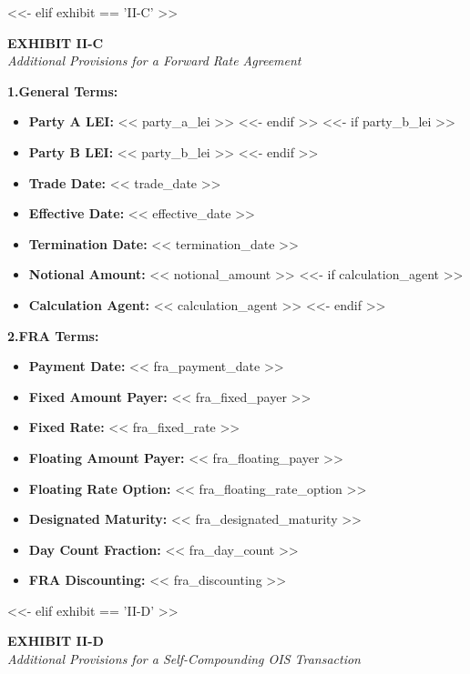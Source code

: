 \documentclass[11pt, a4paper]{article}
\begin{document}
<<- elif exhibit == 'II-C' >>
\begin{center}
    \textbf{EXHIBIT II-C} \\
    \textit{Additional Provisions for a Forward Rate Agreement}
\end{center}

\vspace{0.3cm}
\noindent \textbf{1.\quad General Terms:}
\begin{itemize}[leftmargin=2cm, label={}, itemsep=3pt]
<<- if party_a_lei >>
    \item \textbf{Party A LEI:} << party_a_lei >>
<<- endif >>
<<- if party_b_lei >>
    \item \textbf{Party B LEI:} << party_b_lei >>
<<- endif >>
    \item \textbf{Trade Date:} << trade_date >>
    \item \textbf{Effective Date:} << effective_date >>
    \item \textbf{Termination Date:} << termination_date >>
    \item \textbf{Notional Amount:} << notional_amount >>
<<- if calculation_agent >>
    \item \textbf{Calculation Agent:} << calculation_agent >>
<<- endif >>
\end{itemize}

\vspace{0.3cm}
\noindent \textbf{2.\quad FRA Terms:}
\begin{itemize}[leftmargin=2cm, label={}, itemsep=3pt]
    \item \textbf{Payment Date:} << fra_payment_date >>
    \item \textbf{Fixed Amount Payer:} << fra_fixed_payer >>
    \item \textbf{Fixed Rate:} << fra_fixed_rate >>
    \item \textbf{Floating Amount Payer:} << fra_floating_payer >>
    \item \textbf{Floating Rate Option:} << fra_floating_rate_option >>
    \item \textbf{Designated Maturity:} << fra_designated_maturity >>
    \item \textbf{Day Count Fraction:} << fra_day_count >>
    \item \textbf{FRA Discounting:} << fra_discounting >>
\end{itemize}

<<- elif exhibit == 'II-D' >>
\begin{center}
    \textbf{EXHIBIT II-D} \\
    \textit{Additional Provisions for a Self-Compounding OIS Transaction}
\end{center}
\end{document}
